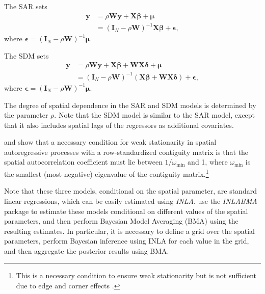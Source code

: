 The SAR sets
\begin{align*}
	\boldsymbol{y} &= \rho\boldsymbol{Wy} + \boldsymbol{X\beta} + \boldsymbol{\mu}\\
	 &= (\boldsymbol{I}_N-\rho\boldsymbol{W})^{-1}\boldsymbol{X\beta} + \boldsymbol{\epsilon},
\end{align*}
where $\boldsymbol{\epsilon}=(\boldsymbol{I}_N-\rho\boldsymbol{W})^{-1}\boldsymbol{\mu}$.

The SDM sets
\begin{align*}
	\boldsymbol{y} &= \rho\boldsymbol{Wy} + \boldsymbol{X\beta} +  \boldsymbol{WX\delta} + \boldsymbol{\mu}\\
	&= (\boldsymbol{I}_N-\rho\boldsymbol{W})^{-1}(\boldsymbol{X\beta} +  \boldsymbol{WX\delta}) + \boldsymbol{\epsilon},
\end{align*}
where $\boldsymbol{\epsilon}=(\boldsymbol{I}_N-\rho\boldsymbol{W})^{-1}\boldsymbol{\mu}$.

The degree of spatial dependence in the SAR and SDM models is determined by the parameter \( \rho \). Note that the SDM model is similar to the SAR model, except that it also includes spatial lags of the regressors as additional covariates.

\cite{ord75} and \cite{anselin82} show that a necessary condition for weak stationarity in spatial autoregressive processes with a row-standardized contiguity matrix is that the spatial autocorrelation coefficient must lie between \( 1/\omega_{\min} \) and 1, where \( \omega_{\min} \) is the smallest (most negative) eigenvalue of the contiguity matrix.\footnote{This is a necessary condition to ensure weak stationarity but is not sufficient due to edge and corner effects \cite[]{haining90}.}

Note that these three models, conditional on the spatial parameter, are standard linear regressions, which can be easily estimated using \textit{INLA}. \cite{bivand2015spatial} use the \textit{INLABMA} package to estimate these models conditional on different values of the spatial parameters, and then perform Bayesian Model Averaging (BMA) using the resulting estimates. In particular, it is necessary to define a grid over the spatial parameters, perform Bayesian inference using INLA for each value in the grid, and then aggregate the posterior results using BMA.


